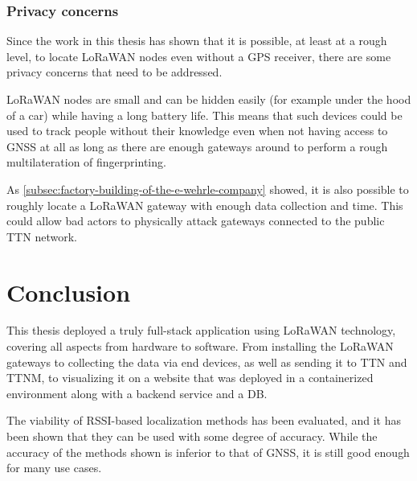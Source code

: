 \subsubsection{Privacy concerns}

Since the work in this thesis has shown that it is possible, at least at a rough level, to locate \ac{LoRaWAN} nodes even without a \ac{GPS} receiver, there are some privacy concerns that need to be addressed.

\ac{LoRaWAN} nodes are small and can be hidden easily (for example under the hood of a car) while having a long battery life.
This means that such devices could be used to track people without their knowledge even when not having access to \ac{GNSS} at all as long as there are enough gateways around to perform a rough multilateration of fingerprinting.

As \cref{subsec:factory-building-of-the-e-wehrle-company} showed, it is also possible to roughly locate a \ac{LoRaWAN} gateway with enough data collection and time.
This could allow bad actors to physically attack gateways connected to the public \ac{TTN} network.

\section{Conclusion}


This thesis deployed a truly full-stack application using \ac{LoRaWAN} technology, covering all aspects from hardware to software.
From installing the \ac{LoRaWAN} gateways to collecting the data via end devices, as well as sending it to \ac{TTN} and \ac{TTNM}, to visualizing it on a website that was deployed in a containerized environment along with a backend service and a \ac{DB}.

The viability of \ac{RSSI}-based localization methods has been evaluated, and it has been shown that they can be used with some degree of accuracy.
While the accuracy of the methods shown is inferior to that of \ac{GNSS}, it is still good enough for many use cases.